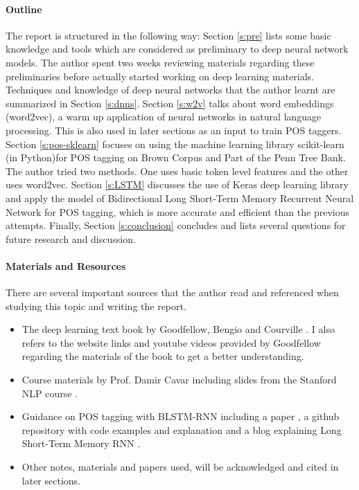 \documentclass[11pt]{article}
\theoremstyle{plain}
\begin{document}
\paragraph{Outline}The report is structured in the following way: 
Section \ref{s:pre} lists some basic knowledge and tools which are 
considered as preliminary to deep neural network models. The author spent 
two weeks reviewing materials regarding these preliminaries before actually 
started working on deep learning materials. Techniques and knowledge of 
deep neural networks that the author learnt are summarized in Section 
\ref{s:dnns}.  Section \ref{s:w2v} talks about 
word embeddings (word2vec), a warm up application of neural networks in 
natural language processing. This is also used in later sections as an input to 
train POS taggers. Section \ref{s:pos-sklearn} focuses on using the machine 
learning library scikit-learn (in Python)for POS tagging on Brown Corpus and 
Part of the Penn Tree Bank. The author tried two methods. One uses 
basic token level features and the other uses word2vec. Section \ref{s:LSTM} 
discusses the use of Keras deep learning library and 
apply the model of Bidirectional Long Short-Term Memory Recurrent Neural 
Network for POS tagging, which is more accurate and efficient than the 
previous attempts. Finally, Section \ref{s:conclusion} concludes and lists 
several questions for future research and discussion. 


\paragraph{Materials and Resources }
There are several important sources that the author read and referenced 
when studying this topic and writing the report. 
\begin{itemize}
	\item The deep learning text book by Goodfellow, Bengio and Courville 
	\cite{Goodfellow-et-al-2016}. I also refers to the website links and youtube 
	videos provided by Goodfellow regarding the materials of the book to get 
	a better understanding. 
	\item Course materials by Prof. Damir Cavar \cite{Cavar2018-i665} 
	including slides from the Stanford NLP course \cite{CS224}. 
	\item Guidance on POS tagging with BLSTM-RNN including a paper 
	\cite{Wang2015PartofSpeechTW}, a github repository with code examples 
	and explanation \cite{aneesh-joshi-LSTM-POS-Tagger} and a blog 
	explaining Long Short-Term Memory RNN \cite{olah-blog-lstm}.
	\item Other notes, materials and papers used, will be acknowledged and 
	cited in later sections.
\end{itemize}
\end{document}
